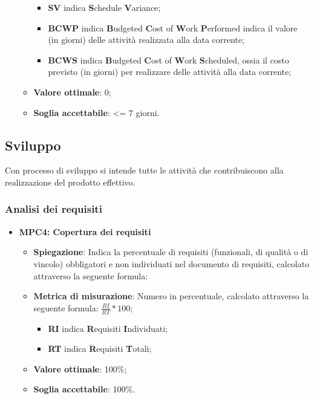 \begin{itemize}
\begin{itemize}
        \begin{itemize}
            \item \textbf{SV} indica \textbf{S}chedule \textbf{V}ariance;
            \item \textbf{BCWP} indica \textbf{B}udgeted \textbf{C}ost of \textbf{W}ork \textbf{P}erformed indica il valore (in giorni) delle attività realizzata alla data corrente;
            \item \textbf{BCWS} indica \textbf{B}udgeted \textbf{C}ost of \textbf{W}ork \textbf{S}cheduled, ossia il costo previsto (in giorni) per realizzare delle attività alla data corrente;
        \end{itemize}
        \item \textbf{Valore ottimale}: 0;
        \item \textbf{Soglia accettabile}: <= 7 giorni.
    \end{itemize}
\end{itemize}

\subsection{Sviluppo}
Con processo di sviluppo si intende tutte le attività che contribuiscono alla realizzazione del prodotto effettivo. 

\subsubsection{Analisi dei requisiti} 
\begin{itemize}
    \item \textbf{MPC4: Copertura dei requisiti}
    \begin{itemize}
        \item \textbf{Spiegazione}: Indica la percentuale di requisiti (funzionali, di qualità o di vincolo) obbligatori e non individuati nel documento di requisiti, calcolato attraverso la seguente formula:
        \item \textbf{Metrica di misurazione}: Numero in percentuale, calcolato attraverso la seguente formula: \textbf{$\frac{RI}{RT} * 100$};
            \begin{itemize}
                \item \textbf{RI} indica \textbf{R}equisiti \textbf{I}ndividuati;
                \item \textbf{RT} indica \textbf{R}equisiti \textbf{T}otali;
            \end{itemize}
        \item \textbf{Valore ottimale}: 100\%;
        \item \textbf{Soglia accettabile}: 100\%.
    \end{itemize}
\end{itemize}

